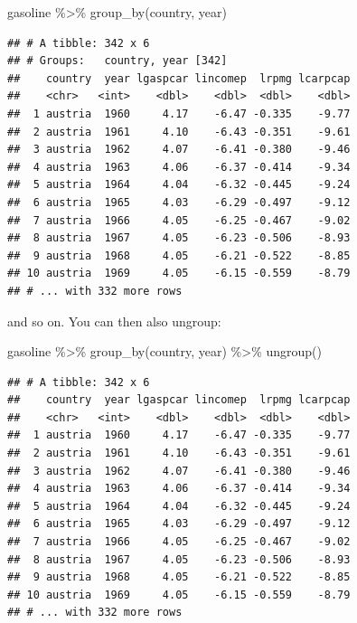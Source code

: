 \documentclass[
]{article}
\newenvironment{Shaded}{\begin{snugshade}}{\end{snugshade}}
\newcommand{\FunctionTok}[1]{\textcolor[rgb]{0.00,0.00,0.00}{#1}}
\newcommand{\NormalTok}[1]{#1}
\newcommand{\SpecialCharTok}[1]{\textcolor[rgb]{0.00,0.00,0.00}{#1}}
\begin{document}
\begin{Shaded}
\begin{Highlighting}[]
\NormalTok{gasoline }\SpecialCharTok{\%\textgreater{}\%}
  \FunctionTok{group\_by}\NormalTok{(country, year)}
\end{Highlighting}
\end{Shaded}

\begin{verbatim}
## # A tibble: 342 x 6
## # Groups:   country, year [342]
##    country  year lgaspcar lincomep  lrpmg lcarpcap
##    <chr>   <int>    <dbl>    <dbl>  <dbl>    <dbl>
##  1 austria  1960     4.17    -6.47 -0.335    -9.77
##  2 austria  1961     4.10    -6.43 -0.351    -9.61
##  3 austria  1962     4.07    -6.41 -0.380    -9.46
##  4 austria  1963     4.06    -6.37 -0.414    -9.34
##  5 austria  1964     4.04    -6.32 -0.445    -9.24
##  6 austria  1965     4.03    -6.29 -0.497    -9.12
##  7 austria  1966     4.05    -6.25 -0.467    -9.02
##  8 austria  1967     4.05    -6.23 -0.506    -8.93
##  9 austria  1968     4.05    -6.21 -0.522    -8.85
## 10 austria  1969     4.05    -6.15 -0.559    -8.79
## # ... with 332 more rows
\end{verbatim}

and so on. You can then also ungroup:

\begin{Shaded}
\begin{Highlighting}[]
\NormalTok{gasoline }\SpecialCharTok{\%\textgreater{}\%}
  \FunctionTok{group\_by}\NormalTok{(country, year) }\SpecialCharTok{\%\textgreater{}\%}
  \FunctionTok{ungroup}\NormalTok{()}
\end{Highlighting}
\end{Shaded}

\begin{verbatim}
## # A tibble: 342 x 6
##    country  year lgaspcar lincomep  lrpmg lcarpcap
##    <chr>   <int>    <dbl>    <dbl>  <dbl>    <dbl>
##  1 austria  1960     4.17    -6.47 -0.335    -9.77
##  2 austria  1961     4.10    -6.43 -0.351    -9.61
##  3 austria  1962     4.07    -6.41 -0.380    -9.46
##  4 austria  1963     4.06    -6.37 -0.414    -9.34
##  5 austria  1964     4.04    -6.32 -0.445    -9.24
##  6 austria  1965     4.03    -6.29 -0.497    -9.12
##  7 austria  1966     4.05    -6.25 -0.467    -9.02
##  8 austria  1967     4.05    -6.23 -0.506    -8.93
##  9 austria  1968     4.05    -6.21 -0.522    -8.85
## 10 austria  1969     4.05    -6.15 -0.559    -8.79
## # ... with 332 more rows
\end{verbatim}
\end{document}
